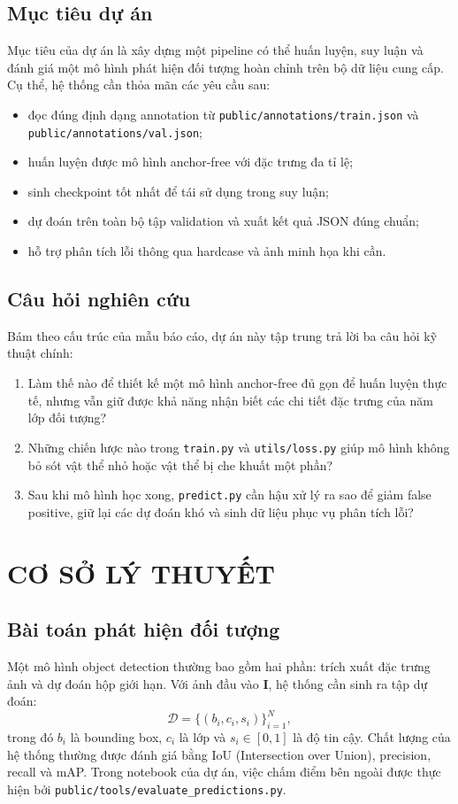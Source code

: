\documentclass[12pt,a4paper]{article}
\begin{document}
\subsection{Mục tiêu dự án}
Mục tiêu của dự án là xây dựng một pipeline có thể huấn luyện, suy luận và đánh giá một mô hình phát hiện đối tượng hoàn chỉnh trên bộ dữ liệu cung cấp. Cụ thể, hệ thống cần thỏa mãn các yêu cầu sau:
\begin{itemize}
    \item đọc đúng định dạng annotation từ \texttt{public/annotations/train.json} và \texttt{public/annotations/val.json};
    \item huấn luyện được mô hình anchor-free với đặc trưng đa tỉ lệ;
    \item sinh checkpoint tốt nhất để tái sử dụng trong suy luận;
    \item dự đoán trên toàn bộ tập validation và xuất kết quả JSON đúng chuẩn;
    \item hỗ trợ phân tích lỗi thông qua hardcase và ảnh minh họa khi cần.
\end{itemize}

\subsection{Câu hỏi nghiên cứu}
Bám theo cấu trúc của mẫu báo cáo, dự án này tập trung trả lời ba câu hỏi kỹ thuật chính:
\begin{enumerate}
    \item Làm thế nào để thiết kế một mô hình anchor-free đủ gọn để huấn luyện thực tế, nhưng vẫn giữ được khả năng nhận biết các chi tiết đặc trưng của năm lớp đối tượng?
    \item Những chiến lược nào trong \texttt{train.py} và \texttt{utils/loss.py} giúp mô hình không bỏ sót vật thể nhỏ hoặc vật thể bị che khuất một phần?
    \item Sau khi mô hình học xong, \texttt{predict.py} cần hậu xử lý ra sao để giảm false positive, giữ lại các dự đoán khó và sinh dữ liệu phục vụ phân tích lỗi?
\end{enumerate}

\section{CƠ SỞ LÝ THUYẾT}

\subsection{Bài toán phát hiện đối tượng}
Một mô hình object detection thường bao gồm hai phần: trích xuất đặc trưng ảnh và dự đoán hộp giới hạn. Với ảnh đầu vào $\mathbf{I}$, hệ thống cần sinh ra tập dự đoán:
\[
\mathcal{D} = \{(b_i, c_i, s_i)\}_{i=1}^{N},
\]
trong đó $b_i$ là bounding box, $c_i$ là lớp và $s_i \in [0,1]$ là độ tin cậy. Chất lượng của hệ thống thường được đánh giá bằng IoU (Intersection over Union), precision, recall và mAP. Trong notebook của dự án, việc chấm điểm bên ngoài được thực hiện bởi \texttt{public/tools/evaluate\_predictions.py}.
\end{document}
